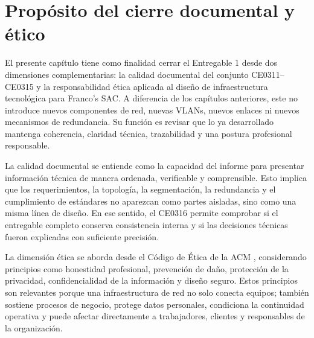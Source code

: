 \documentclass[11pt, a4paper, oneside]{report}
\begin{document}
\section{Propósito del cierre documental y ético}

El presente capítulo tiene como finalidad cerrar el Entregable 1 desde dos dimensiones complementarias: la calidad documental del conjunto CE0311--CE0315 y la responsabilidad ética aplicada al diseño de infraestructura tecnológica para Franco's SAC. A diferencia de los capítulos anteriores, este no introduce nuevos componentes de red, nuevas VLANs, nuevos enlaces ni nuevos mecanismos de redundancia. Su función es revisar que lo ya desarrollado mantenga coherencia, claridad técnica, trazabilidad y una postura profesional responsable.

La calidad documental se entiende como la capacidad del informe para presentar información técnica de manera ordenada, verificable y comprensible. Esto implica que los requerimientos, la topología, la segmentación, la redundancia y el cumplimiento de estándares no aparezcan como partes aisladas, sino como una misma línea de diseño. En ese sentido, el CE0316 permite comprobar si el entregable completo conserva consistencia interna y si las decisiones técnicas fueron explicadas con suficiente precisión.

La dimensión ética se aborda desde el Código de Ética de la ACM \cite{acmcode}, considerando principios como honestidad profesional, prevención de daño, protección de la privacidad, confidencialidad de la información y diseño seguro. Estos principios son relevantes porque una infraestructura de red no solo conecta equipos; también sostiene procesos de negocio, protege datos personales, condiciona la continuidad operativa y puede afectar directamente a trabajadores, clientes y responsables de la organización.

\renewcommand{\arraystretch}{1.3}
\footnotesize
{}
\end{document}
